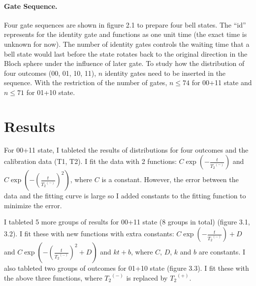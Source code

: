 \documentclass[letterpaper]{article}
\numberwithin{equation}{section} %
\numberwithin{figure}{section} %
\numberwithin{table}{section} %
\begin{document}
\paragraph{Gate Sequence.}
Four gate sequences are shown in figure 2.1 to prepare four bell states. The \enquote{id} represents for the identity gate and functions as one unit time (the exact time is unknown for now). The number of identity gates controls the waiting time that a bell state would last before the state rotates back to the original direction in the Bloch sphere under the influence of later gate. To study how the distribution of four outcomes (00, 01, 10, 11), $n$ identity gates need to be inserted in the sequence. With the restriction of the number of gates, $n\leq74$ for 00+11 state and $n\leq71$ for 01+10 state. 



\section{Results}

For 00+11 state, I tableted the results of distributions for four outcomes and the calibration data (T1, T2). I fit the data with 2 functions: $C \exp(- \frac{t}{{T_2}^{(-)}})$ and $C \exp(- (\frac{t}{{T_2}^{(-)}})^2)$, where $C$ is a constant. However, the error between the data and the fitting curve is large so I added constants to the fitting function to minimize the error. 

I tableted 5 more groups of results for 00+11 state (8 groups in total) (figure 3.1, 3.2). I fit these with new functions with extra constants: $C \exp(- \frac{t}{{T_2}^{(-)}})+D$ and $C \exp(- (\frac{t}{{T_2}^{(-)}})^2+D)$ and $k t + b$, where $C$, $D$, $k$ and $b$ are constants. I also tableted two groups of outcomes for 01+10 state (figure 3.3). I fit these with the above three functions, where ${T_2}^{(-)}$ is replaced by ${T_2}^{(+)}$. 
\end{document}
